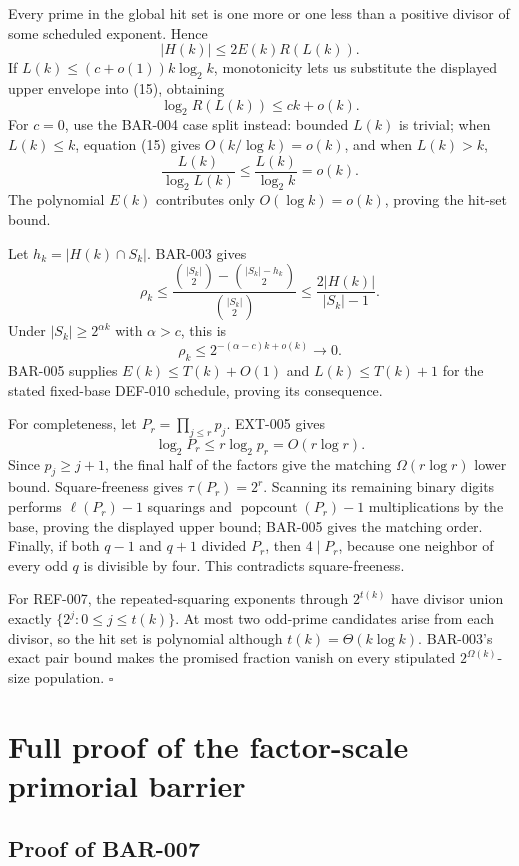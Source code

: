 \documentclass[11pt]{article}
\begin{document}
Every prime in the global hit set is one more or one less than a positive
divisor of some scheduled exponent. Hence
\[
|H(k)|\le2E(k)R(L(k)).
\]
If \(L(k)\le(c+o(1))k\log_2k\), monotonicity lets us substitute the displayed
upper envelope into (15), obtaining
\[
\log_2R(L(k))\le ck+o(k).
\]
For \(c=0\), use the BAR-004 case split instead: bounded \(L(k)\) is trivial;
when \(L(k)\le k\), equation (15) gives \(O(k/\log k)=o(k)\), and when
\(L(k)>k\),
\[
\frac{L(k)}{\log_2L(k)}
\le\frac{L(k)}{\log_2k}
=o(k).
\]
The polynomial \(E(k)\) contributes only \(O(\log k)=o(k)\), proving the
hit-set bound.

Let \(h_k=|H(k)\cap S_k|\). BAR-003 gives
\[
\rho_k
\le
\frac{\binom{|S_k|}{2}-\binom{|S_k|-h_k}{2}}
     {\binom{|S_k|}{2}}
\le\frac{2|H(k)|}{|S_k|-1}.
\]
Under \(|S_k|\ge2^{\alpha k}\) with \(\alpha>c\), this is
\[
\rho_k\le2^{-(\alpha-c)k+o(k)}\longrightarrow0.
\]
BAR-005 supplies \(E(k)\le T(k)+O(1)\) and \(L(k)\le T(k)+1\) for the stated
fixed-base DEF-010 schedule, proving its consequence.

For completeness, let \(P_r=\prod_{j\le r}p_j\). EXT-005 gives
\[
\log_2P_r\le r\log_2p_r=O(r\log r).
\]
Since \(p_j\ge j+1\), the final half of the factors give the matching
\(\Omega(r\log r)\) lower bound. Square-freeness gives
\(\tau(P_r)=2^r\). Scanning its remaining binary digits performs
\(\ell(P_r)-1\) squarings and \(\operatorname{popcount}(P_r)-1\)
multiplications by the base, proving the displayed upper bound; BAR-005 gives
the matching order. Finally, if both \(q-1\) and \(q+1\) divided \(P_r\), then
\(4\mid P_r\), because one neighbor of every odd \(q\) is divisible by four.
This contradicts square-freeness.

For REF-007, the repeated-squaring exponents through \(2^{t(k)}\) have divisor
union exactly \(\{2^j:0\le j\le t(k)\}\). At most two odd-prime candidates
arise from each divisor, so the hit set is polynomial although
\(t(k)=\Theta(k\log k)\). BAR-003's exact pair bound makes the promised
fraction vanish on every stipulated
\(2^{\Omega(k)}\)-size population. \(\square\)

\section{Full proof of the factor-scale primorial barrier}

\subsection{Proof of BAR-007}\label{proof:BAR-007}
\end{document}
